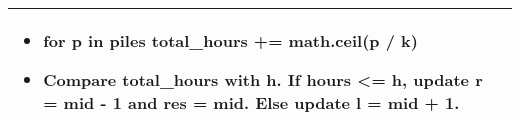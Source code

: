 \begin{summary}
\begin{center}
\begin{tabular}{ll}
{\begin{itemize}
                    \begin{itemize}
                        \item for p in piles total\_hours += math.ceil(p / k)
                        \item Compare total\_hours with h. If hours <= h, update r = mid - 1 and res = mid. Else update l = mid + 1.
                    \end{itemize}
                \end{itemize}
            } \\
            \bottomrule
        \end{tabular}
    \end{center}
\end{summary}
